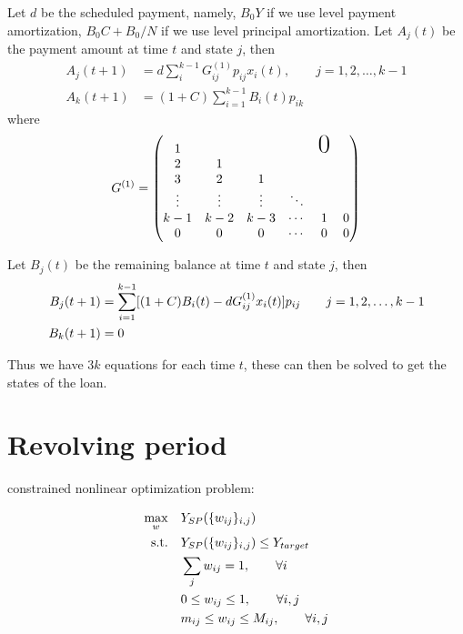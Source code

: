 Let $d$ be the scheduled payment, namely, $B_0 Y$ if we use level payment
amortization, $B_0 C + B_0 / N$ if we use level principal amortization.
Let $A_j(t)$ be the payment amount at time $t$ and state $j$, then
\begin{align}
  A_j(t+1) &= d \sum_i^{k-1} G_{ij}^{(1)} p_{ij} x_i(t), \qquad j=1,2,\dots,k-1 \\
  A_{k}(t+1) &= (1+C) \sum_{i=1}^{k-1} B_i(t) p_{ik}
\end{align}
where
\begin{equation}
  G^{(1)} =
  \begin{pmatrix}
    1      &        &        &        & \text{\huge0} \\
    2      & 1      &        &        &        \\
    3      & 2      & 1      &        &        \\
    \vdots & \vdots & \vdots & \ddots &   &   \\
    k-1    & k-2    & k-3    & \cdots & 1 & 0 \\
    0      & 0      & 0      & \cdots & 0 & 0
  \end{pmatrix}
\end{equation}

Let $B_j(t)$ be the remaining balance at time $t$ and state $j$, then
\begin{align}
  B_j(t+1) &= \sum_{i=1}^{k-1} [(1+C) B_i(t) - d G_{ij}^{(1)} x_i(t)] p_{ij}
       \qquad j=1,2,\dots,k-1  \notag \\ 
  B_k(t+1) &= 0
\end{align}

Thus we have $3k$ equations for each time $t$, these can then be solved to get
the states of the loan.

\section{Revolving period}

constrained nonlinear optimization problem:

\begin{align*}
  \max_{w} \quad & Y_{SP}(\{w_{ij}\}_{i,j}) \notag \\
  \textrm{s.t.} \quad & Y_{SP}(\{w_{ij}\}_{i,j}) \le Y_{target} \notag \\
  & \sum_j w_{ij} = 1, \qquad \forall i \notag \\
  & 0\le w_{ij} \le 1, \qquad \forall i,j \notag \\
  & m_{ij} \le w_{ij} \le M_{ij}, \qquad \forall i,j \notag 
\end{align*}

